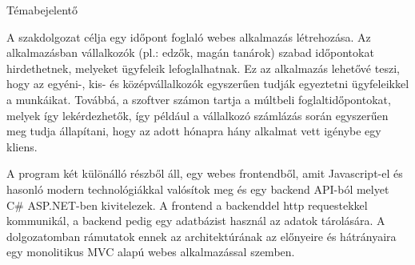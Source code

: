 {\Huge{Témabejelentő}}

A szakdolgozat célja egy időpont foglaló webes alkalmazás létrehozása. Az alkalmazásban vállalkozók (pl.: edzők, magán tanárok) szabad időpontokat hirdethetnek, melyeket ügyfeleik lefoglalhatnak. Ez az alkalmazás lehetővé teszi, hogy az egyéni-, kis- és középvállalkozók egyszerűen tudják egyeztetni ügyfeleikkel a munkáikat. Továbbá, a szoftver számon tartja a múltbeli foglaltidőpontokat, melyek így lekérdezhetők, így például a vállalkozó számlázás során egyszerűen meg tudja állapítani, hogy az adott hónapra hány alkalmat vett igénybe egy kliens.

A program két különálló részből áll, egy webes frontendből, amit Javascript-el és hasonló modern technológiákkal valósítok meg és egy backend API-ból melyet C\# ASP.NET-ben kivitelezek. A frontend a backenddel http requestekkel kommunikál, a backend pedig egy adatbázist használ az adatok tárolására. A dolgozatomban rámutatok ennek az architektúrának az előnyeire és hátrányaira egy monolitikus MVC alapú webes alkalmazással szemben.

